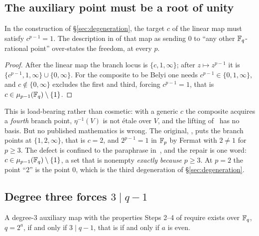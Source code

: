 \subsection{The auxiliary point must be a root of unity}
\label{sec:c-correction}

\begin{proposition}
\label{prop:c-correction}
In the construction of \S\ref{sec:degeneration}, the target $c$ of the
linear map must satisfy $c^{p-1} = 1$. The description in
\textup{\cite[Proposition 4.3]{kramermillerupton2021newton}} of that map as sending
$0$ to ``any other $\mathbb{F}_q$-rational point'' over-states the freedom, at every
$p$.
\end{proposition}

\begin{proof}
After the linear map the branch locus is $\{c,1,\infty\}$; after $z \mapsto
z^{p-1}$ it is $\{c^{p-1},1,\infty\}\cup\{0,\infty\}$. For the composite to
be Belyi one needs $c^{p-1} \in \{0,1,\infty\}$, and $c \notin
\{0,\infty\}$ excludes the first and third, forcing $c^{p-1} = 1$, that is
$c \in \mu_{p-1}(\mathbb{F}_q)\setminus\{1\}$.
\end{proof}

This is load-bearing rather than cosmetic: with a generic $c$ the composite
acquires a \emph{fourth} branch point, $\eta^{-1}(V)$ is not \'etale over
$V$, and the lifting of~\cite[\S4.2]{kramermillerupton2021newton} has no basis. But
no published mathematics is wrong. The original,
\cite[Lemma 3.1]{kramermiller2021padic}, puts the branch points at
$\{1,2,\infty\}$, that is $c = 2$, and $2^{p-1} = 1$ in $\mathbb{F}_p$ by Fermat
with $2 \ne 1$ for $p \ge 3$. The defect is confined to the paraphrase in~\cite{kramermillerupton2021newton}, and the repair is one word: $c \in
\mu_{p-1}(\mathbb{F}_q)\setminus\{1\}$, a set that is nonempty \emph{exactly because}
$p \ge 3$. At $p = 2$ the point ``$2$'' is the point $0$, which is the third
degeneration of \S\ref{sec:degeneration}.

\subsection{Degree three forces \texorpdfstring{$3 \mid q-1$}{3 | q-1}}
\label{sec:three-divides}

\begin{proposition}
\label{prop:three-divides}
A degree-$3$ auxiliary map with the properties Steps 2--4 of
 require exists over $\mathbb{F}_q$, $q = 2^a$, if and only if $3
\mid q-1$, that is if and only if $a$ is even.
\end{proposition}


